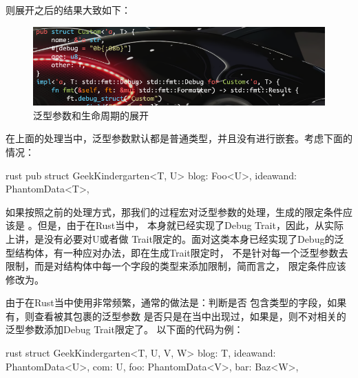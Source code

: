 则展开之后的结果大致如下：
\begin{figure}[H]
  \centering
  \includegraphics[width=\linewidth]{rust_with_generic_and_lifetime.png}
  \caption{泛型参数和生命周期的展开}
  \label{fig:rust_with_generic_and_lifetime}
\end{figure}

在上面的处理当中，泛型参数默认都是普通类型，并且没有进行嵌套。考虑下面的情况：
\begin{code-block}{rust}
pub struct GeekKindergarten<T, U> {
    blog: Foo<U>,
    ideawand: PhantomData<T>,
}
\end{code-block}
如果按照之前的处理方式，那我们的过程宏对泛型参数的处理，生成的限定条件应该是
。但是，由于在Rust当中，
本身就已经实现了Debug Trait，因此，从实际上讲，是没有必要对U或者做
Trait限定的。面对这类本身已经实现了Debug的泛型结构体，有一种应对办法，即在生成Trait限定时，
不是针对每一个泛型参数去限制，而是对结构体中每一个字段的类型来添加限制，简而言之，
限定条件应该修改为。

由于在Rust当中使用非常频繁，通常的做法是：判断是否
包含类型的字段，如果有，则查看被其包裹的泛型参数
是否只是在当中出现过，如果是，则不对相关的泛型参数添加Debug Trait限定了。
以下面的代码为例：
\begin{code-block}{rust}
struct GeekKindergarten<T, U, V, W> {
    blog: T,
    ideawand: PhantomData<U>,
    com: U,
    foo: PhantomData<V>,
    bar: Baz<W>,
}
\end{code-block}

